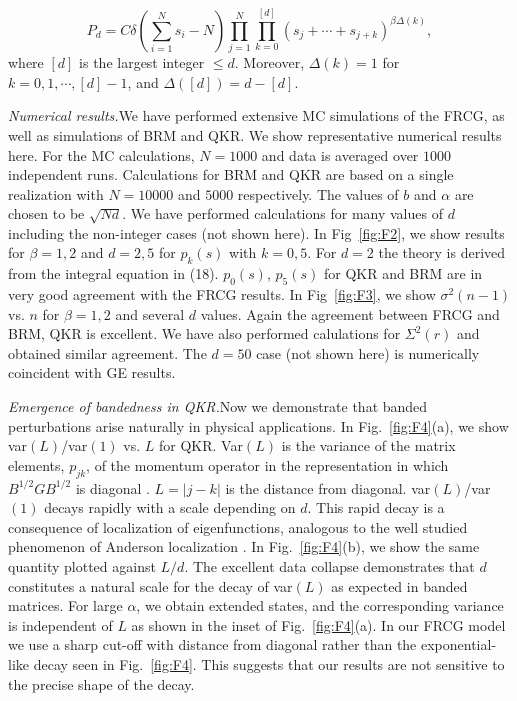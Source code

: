 \documentclass[reprint,amsmath,amssymb,showpacs,aps,]{revtex4-1}
\begin{document}
{\begin{equation}\label{eq:31}
P_{d}=C\delta(\sum_{i=1}^{N}s_{i}-N) \prod_{j=1}^{N}\prod_{k=0}^{[d]}(s_{j}+\cdots+s_{j+k})^{\beta\Delta(k)},
\end{equation}
where $[d]$ is the largest integer $\leq d$. Moreover, $\Delta(k)=1$ for $k=0,1,\cdots, [d]-1$, and $\Delta([d])=d-[d]$. \par
\textit{Numerical results.}\textemdash We have performed extensive MC simulations of the FRCG, as well as simulations of BRM and QKR. We show representative numerical results here. For the MC calculations, $N=1000$ and data is averaged over $1000$ independent runs. Calculations for BRM and QKR are based on a single realization with $N=10000$ and $5000$ respectively. The values of $b$ and $\alpha$ are chosen to be $\sqrt{Nd}$. We have performed calculations for many values of $d$ including the non-integer cases (not shown here). In Fig~\ref{fig:F2}, we show results for $\beta=1, 2$ and $d=2, 5$ for $p_{k}(s)$ with $k=0, 5$. For $d=2$ the theory is derived from the integral equation in (18).  $p_{0}(s)$, $p_{5}(s)$ for QKR and BRM are in very good agreement with the FRCG results. In Fig~\ref{fig:F3}, we show $\sigma^{2}(n-1)$ vs. $n$  for $\beta=1,2$ and several $d$ values. Again the agreement between FRCG and BRM, QKR is excellent. We have also performed calulations for $\Sigma^{2}(r)$ and obtained similar agreement. The $d=50$ case (not shown here) is numerically coincident with GE results.\par 
\textit{Emergence of bandedness in QKR.}\textemdash Now we demonstrate that banded perturbations arise naturally in physical applications. In Fig.~\ref{fig:F4}(a), we show var$(L)$/var$(1)$ vs. $L$ for QKR. Var$(L)$ is the variance of the matrix elements, $p_{jk}$, of the momentum operator in the representation in which $B^{1/2}GB^{1/2}$ is diagonal \cite{PRS,SP}. $L=|j-k|$ is the distance from diagonal. var$(L)$/var$(1)$ decays rapidly with a scale depending on $d$. This rapid decay is a consequence of localization of eigenfunctions, analogous to the well studied phenomenon of Anderson localization \cite{PF,CMI,CGIS}. In Fig.~\ref{fig:F4}(b), we show the same quantity plotted against $L/d$. The excellent data collapse demonstrates that $d$ constitutes a natural scale for the decay of var$(L)$ as expected in banded matrices. For large $\alpha$, we obtain extended states, and the corresponding variance is independent of $L$ as shown in the inset of Fig.~\ref{fig:F4}(a). In our FRCG model we use a sharp cut-off with distance from diagonal rather than the exponential-like decay seen in Fig.~\ref{fig:F4}. This suggests that our results are not sensitive to the precise shape of the decay. \par
}
\end{document}
